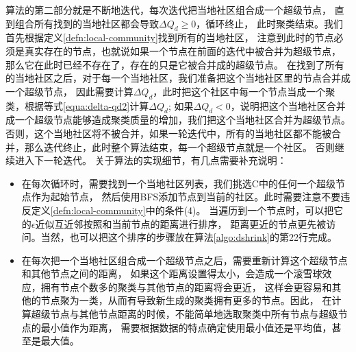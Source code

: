 算法的第二部分就是不断地迭代，每次迭代把当地社区组合成一个超级节点，
直到组合所有找到的当地社区都会导致$\Delta Q_d \geq 0$，循环终止，
此时聚类结束。我们首先根据定义\ref{defn:local-community}找到所有的当地社区，
注意到此时的节点必须是真实存在的节点，也就说如果一个节点在前面的迭代中被合并为超级节点，
那么它在此时已经不存在了，存在的只是它被合并成的超级节点。
在找到了所有的当地社区之后，对于每一个当地社区，我们准备把这个当地社区里的节点合并成一个超级节点，
因此需要计算$\Delta Q_d$，此时把这个社区中每一个节点当成一个聚类，根据等式\ref{equa:delta-qd2}计算$\Delta Q_d$;
如果$\Delta Q_d < 0$，说明把这个当地社区合并成一个超级节点能够造成聚类质量的增加，我们把这个当地社区合并为超级节点。
否则，这个当地社区将不被合并，如果一轮迭代中，所有的当地社区都不能被合并，那么迭代终止，此时整个算法结束，每一个超级节点就是一个社区。
否则继续进入下一轮迭代。
关于算法的实现细节，有几点需要补充说明：

\begin{itemize}
    \item 在每次循环时，需要找到一个当地社区列表，我们挑选C中的任何一个超级节点作为起始节点，
    然后使用BFS添加节点到当前的社区。此时需要注意不要违反定义\ref{defn:local-community}中的条件(4)。
    当遍历到一个节点时，可以把它的$\epsilon$近似互近邻按照和当前节点的距离进行排序，
    距离更近的节点更先被访问。当然，也可以把这个排序的步骤放在算法\ref{algo:dshrink}的第22行完成。

    \item 在每次把一个当地社区组合成一个超级节点之后，需要重新计算这个超级节点和其他节点之间的距离，
    如果这个距离设置得太小，会造成一个滚雪球效应，拥有节点个数多的聚类与其他节点的距离将会更近，
    这样会更容易和其他的节点聚为一类，从而有导致新生成的聚类拥有更多的节点。因此，
    在计算超级节点与其他节点距离的时候，不能简单地选取聚类中所有节点与超级节点的最小值作为距离，
    需要根据数据的特点确定使用最小值还是平均值，甚至是最大值。
\end{itemize}


